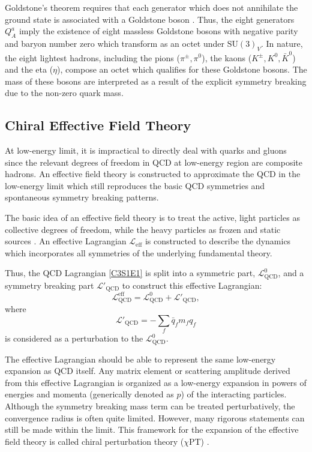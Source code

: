 Goldstone's theorem requires that each generator which does not annihilate the ground state is associated with a Goldstone boson \cite{Goldstone1961, Goldstone1962}. Thus, the eight generators $Q_A^a$ imply the existence of eight massless Goldstone bosons with negative parity and baryon number zero which transform as an octet under $\mathrm{SU}(3)_V$. In nature, the eight lightest hadrons, including the pions ($\pi^\pm, \pi^0$), the kaons ($K^\pm, K^0, \bar{K}^0$) and the eta ($\eta$), compose an octet which qualifies for these Goldstone bosons. The mass of these bosons are interpreted as a result of the explicit symmetry breaking due to the non-zero quark mass.

\subsection{Chiral Effective Field Theory}
\label{C3S1SS2}

At low-energy limit, it is impractical to directly deal with quarks and gluons since the relevant degrees of freedom in QCD at low-energy region are composite hadrons. An effective field theory is constructed to approximate the QCD in the low-energy limit which still reproduces the basic QCD symmetries and spontaneous symmetry breaking patterns.

The basic idea of an effective field theory is to treat the active, light particles as collective degrees of freedom, while the heavy particles as frozen and static sources \cite{Thomas2001}. An effective Lagrangian $\mathcal{L}_{\mathrm{eff}}$ is constructed to describe the dynamics which incorporates all symmetries of the underlying fundamental theory.

Thus, the QCD Lagrangian \cref{C3S1E1} is split into a symmetric part, $\mathcal{L}_{\mathrm{QCD}}^0$, and a symmetry breaking part $\mathcal{L}'_{\mathrm{QCD}}$ to construct this effective Lagrangian:
\begin{equation} \label{C3S1E4}
\mathcal{L}^{\mathrm{eff}}_{\mathrm{QCD}} = \mathcal{L}_{\mathrm{QCD}}^0+\mathcal{L}'_{\mathrm{QCD}},
\end{equation}
where
\begin{equation} \label{C3S1E5}
\mathcal{L}'_{\mathrm{QCD}} = -\sum_f\bar{q}_fm_fq_f
\end{equation}
is considered as a perturbation to the $\mathcal{L}_{\mathrm{QCD}}^0$.

The effective Lagrangian should be able to represent the same low-energy expansion as QCD itself. Any matrix element or scattering amplitude derived from this effective Lagrangian is organized as a low-energy expansion in powers of energies and momenta (generically denoted as $p$) of the interacting particles. Although the symmetry breaking mass term can be treated perturbatively, the convergence radius is often quite limited. However, many rigorous statements can still be made within the limit. This framework for the expansion of the effective field theory is called chiral perturbation theory ($\chi$PT) \cite{Weinberg1979}.

